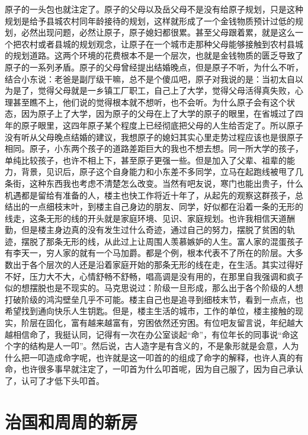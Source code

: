 原子的一头包也就注定了。原子的父母以及岳父母不是没有给原子规划，只是这种规划是给予县城农村同年龄接待的规划，这样就形成了一个金钱物质预计过低的规划，必然出现问题，必然让原子，原子媳妇都很累。甚至父母跟着累，就是这么一个把农村或者县城的规划观念，让原子在一个城市走那种父母能够接触到农村县城的规划道路。这两个环境的花费根本不是一个层次，也就是金钱物质的匮乏导致了原子的一系列矛盾。原子的父母曾经提出结婚晚点，但是原子不听，为什么不听，结合小东说：老爸是副厅级干嘛，总不是个傻瓜吧，原子对我说的是：当初太自以为是了，觉得父母就是一乡镇工厂职工，自己上了大学，觉得父母活得真失败，心理甚至瞧不上，他们说的觉得根本就不想听，也不会听。为什么原子会有这个状态，因为原子上了大学，因为原子的父母在上了大学的原子的眼里，在省城过了四年的原子眼里，这四年原子某个程度上已经彻底把父母的人生给否定了。所以原子没有听从父母晚点结婚的建议，我想原子的媳妇其实心里走势过程应该也是很原子相同。原子，小东两个孩子的道路差距巨大的我也不想去想。同一所大学的孩子，单纯比较孩子，也许不相上下，甚至原子更强一些。但是加入了父辈、祖辈的能力，背景，见识后，原子这个自身能力和小东差不多同学，立马在起跑线被甩了几条街，这种东西我也考虑不清楚怎么改变。当然有吧友说，寒门也能出贵子，什么机遇都是留给有准备的人，楼主也快工作将近十年了，从起先的观察这群孩子，总结出的一点细枝末叶，到楼主自己身边的朋友、同学，好似都在沿着一条的无形的线走，这条无形的线的开头就是家庭环境、见识、家庭规划。也许我相信天道酬勤，但是楼主身边真的没有发生过什么奇迹，通过自己的努力，摆脱了贫困的轨迹，摆脱了那条无形的线，从此过上让周围人羡慕嫉妒的人生。富人家的混蛋孩子有李天一，穷人家的就有一个马加爵。都是个例，根本代表不了所在的阶层。大多数出于各个层次的人还是沿着家庭开始的那条无形的线在走，在生活。其实过得好不好，压力大不大，心情舒畅不舒畅，唱高调是没有用的，在那里自我强调和疯子似的想摆脱也是不现实的。马克思说过：阶级一旦形成，那么出于各个阶级的人想打破阶级的鸿沟壁垒几乎不可能。楼主自己也是追寻到细枝末节，看到一点点，也希望找到通向快乐人生钥匙。但是，楼主生活的城市，工作的单位，楼主接触的现实，阶层在固化，富有越来越富有，穷困依然还穷困。有位吧友留言说，年纪越大越相信命了，我挺认同，记得有一次在办公室谈起“命”，有位年长的同事说“命这个字的结构是人一叩”。然后说，古人造字是有含义的，不是象形就是会意，人为什么把一叩造成命字呢，也许就是这一叩首的的组成了命字的解释，也许人真的有命，也许很多事早就注定了，一叩首为什么叩首呢，因为自己服了，因为自己承认了，认可了才低下头叩首。

\section{治国和周周的新房}

